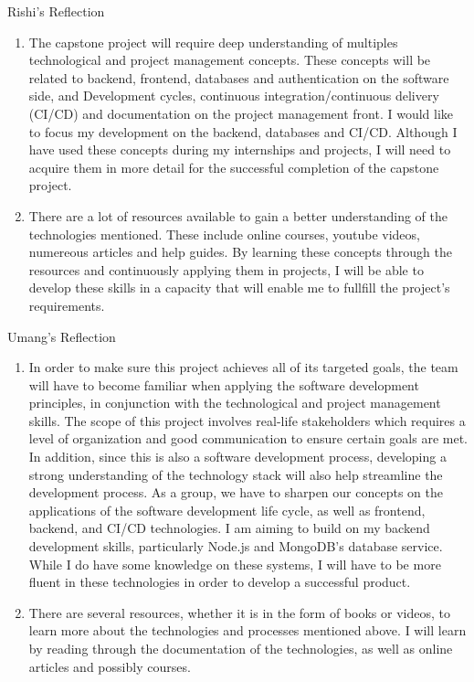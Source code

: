\documentclass[12pt]{article}
\begin{document}
Rishi's Reflection
\begin{enumerate}
    \item The capstone project will require deep understanding of multiples technological and project management concepts. These concepts will be related to backend, frontend, databases and authentication on the software side, and Development cycles, continuous integration/continuous delivery (CI/CD) and documentation on the project management front. I would like to focus my development on the backend, databases and CI/CD. Although I have used these concepts during my internships and projects, I will need to acquire them in more detail for the successful completion of the capstone project.

    \item There are a lot of resources available to gain a better understanding of the technologies mentioned. These include online courses, youtube videos, numereous articles and help guides. By learning these concepts through the resources and continuously applying them in projects, I will be able to develop these skills in a capacity that will enable me to fullfill the project's requirements.
\end{enumerate}

Umang's Reflection
\begin{enumerate}
    \item 
        In order to make sure this project achieves all of its targeted goals, the team will have to become familiar when applying the software development principles, in conjunction with the technological and project management skills. The scope of this project involves real-life stakeholders which requires a level of organization and good communication to ensure certain goals are met. In addition, since this is also a software development process, developing a strong understanding of the technology stack will also help streamline the development process. As a group, we have to sharpen our concepts on the applications of the software development life cycle, as well as frontend, backend, and CI/CD technologies. I am aiming to build on my backend development skills, particularly Node.js and MongoDB's database service. While I do have some knowledge on these systems, I will have to be more fluent in these technologies in order to develop a successful product.

    \item There are several resources, whether it is in the form of books or videos, to learn more about the technologies and processes mentioned above. I will learn by reading through the documentation of the technologies, as well as online articles and possibly courses.
\end{enumerate}
\end{document}
